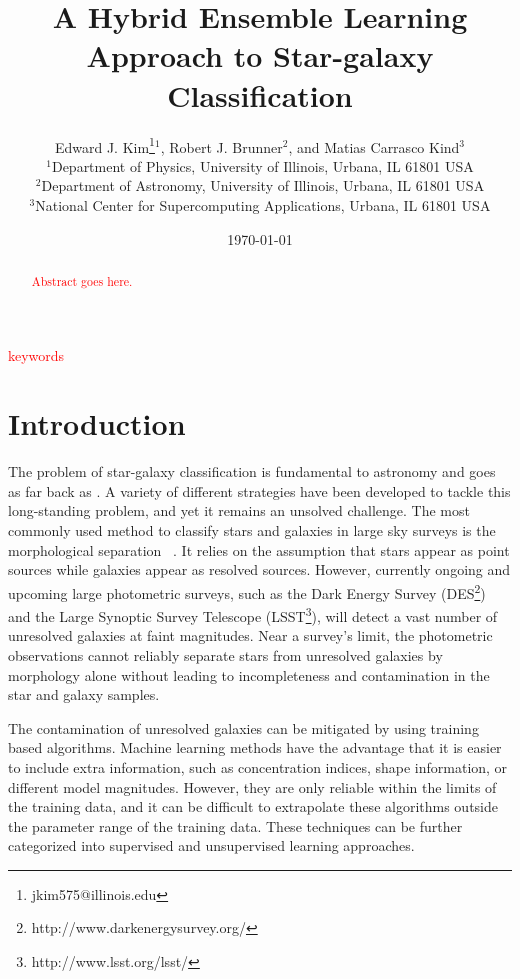 \documentclass[useAMS,usenatbib]{mn2e}
\title{A Hybrid Ensemble Learning Approach to Star-galaxy Classification}
\author[E. J. Kim et al.]{
  Edward J. Kim\thanks{jkim575@illinois.edu}$^1$, Robert J. Brunner$^2$,
  and Matias Carrasco Kind$^3$\\
$^1$Department of Physics, University of Illinois, Urbana, IL 61801 USA\\
$^2$Department of Astronomy, University of Illinois, Urbana, IL 61801 USA\\
$^3$National Center for Supercomputing Applications, Urbana, IL 61801 USA}
\begin{document}
\date{\today}

\pagerange{\pageref{firstpage}--\pageref{lastpage}} 

\maketitle

\label{firstpage}
\begin{abstract}
\textcolor{red}{Abstract goes here.}
\end{abstract}

\begin{keywords}
\textcolor{red}{keywords}
\end{keywords}


\section{Introduction}
  \label{section:introduction}

The problem of star-galaxy classification is fundamental to astronomy
and goes as far back as \cite{messier1781catalogue}.
A variety of different strategies have been developed 
to tackle this long-standing problem,
and yet it remains an unsolved challenge.
The most commonly used method to classify stars and galaxies
in large sky surveys is the morphological separation
~\citep{sebok1979optimal, kron1980photometry, valdes1982resolution,
yee1991faint, vasconcellos2011decision,
henrion2011bayesian}.
It relies on the assumption that
stars appear as point sources
while galaxies appear as resolved sources.
However,
currently ongoing and upcoming large photometric surveys,
such as the Dark Energy Survey
(DES\footnote{http://www.darkenergysurvey.org/})
and the Large Synoptic Survey Telescope
(LSST\footnote{http://www.lsst.org/lsst/}),
will detect a vast number of unresolved galaxies
at faint magnitudes.
Near a survey's limit, the photometric observations
cannot reliably separate stars from unresolved galaxies
by morphology alone without leading to
incompleteness and contamination in the star and galaxy samples.

The contamination of unresolved galaxies can be mitigated
by using training based algorithms.
Machine learning methods have the advantage that
it is easier to include extra information,
such as concentration indices, shape information,
or different model magnitudes.
However,
they are only reliable within the limits of the training data,
and it can be difficult to extrapolate these algorithms
outside the parameter range of the training data.
These techniques can be further categorized into
supervised and unsupervised learning approaches.
\end{document}
